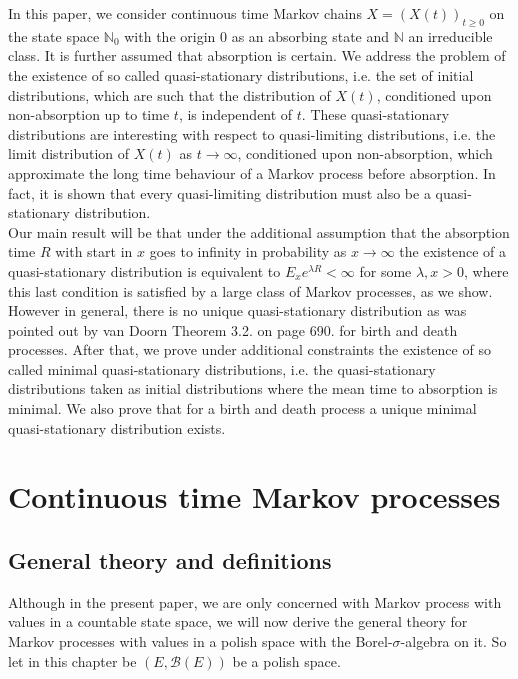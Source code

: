 \documentclass[12pt,a4paper]{scrartcl}
\numberwithin{equation}{section}
\newcommand{\N}{\mathbb{N}} %
\begin{document}
In this paper, we consider continuous time Markov chains $X= \left( X\left(t\right) \right)_{t \geq 0}$ on the state space $\N_0$ with the origin $0$ as an absorbing state and $\N$ an irreducible class. It is further assumed that absorption is certain. We address the problem of the existence of so called quasi-stationary distributions, i.e. the set of initial distributions, which are such that the distribution of $X\left(t\right)$, conditioned upon non-absorption up to time $t$, is independent of $t$. These quasi-stationary distributions are interesting with respect to quasi-limiting distributions, i.e. the limit distribution of $X\left(t\right)$ as $t \to \infty$, conditioned upon non-absorption, which approximate the long time behaviour of a Markov process before absorption. In fact, it is shown that every quasi-limiting distribution must also be a quasi-stationary distribution.\\ 
Our main result will be that under the additional assumption that the absorption time $R$ with start in $x$ goes to infinity in probability as $x \to \infty$ the existence of a quasi-stationary distribution is equivalent to $E_x e^{\lambda R} < \infty$ for some $ \lambda, x > 0$, where this last condition is satisfied by a large class of Markov processes, as we show. However in general, there is no unique quasi-stationary distribution as was pointed out by van Doorn \cite{vanDoorn} Theorem 3.2. on page 690. for birth and death processes.
After that, we prove under additional constraints the existence of so called minimal quasi-stationary distributions, i.e. the quasi-stationary distributions taken as initial distributions where the mean time to absorption is minimal. We also prove that for a birth and death process a unique minimal quasi-stationary distribution exists.


\section{Continuous time Markov processes}


\subsection{General theory and definitions}

Although in the present paper, we are only concerned with Markov process with values in a countable state space, we will now derive the general theory for Markov processes with values in a polish space with the Borel-$\sigma$-algebra on it.
So let in this chapter be $\left(E, \mathcal{B}\left(E\right) \right)$ be a polish space.
\end{document}
